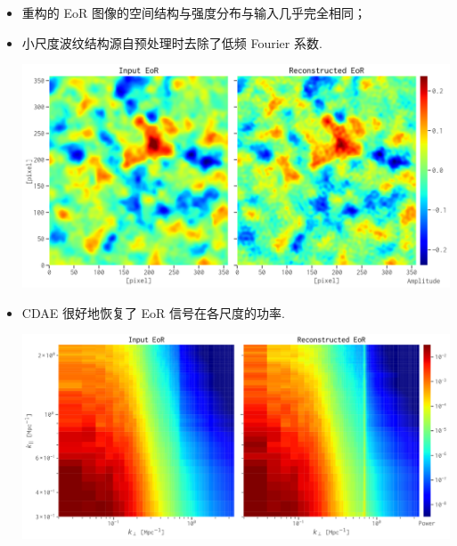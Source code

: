 \documentclass{beamer}
\begin{document}
\begin{frame}
  \vspace{1ex}
  \begin{itemize}
    \item 重构的 EoR 图像的空间结构与强度分布与输入几乎完全相同；
    \item 小尺度波纹结构源自预处理时去除了低频 Fourier 系数.
      \par\includegraphics[height=0.44\textheight]{cdae-eor-img-comp}
    \item CDAE 很好地恢复了 EoR 信号在各尺度的功率.
      \par\includegraphics[height=0.44\textheight]{cdae-eor-ps-comp}
  \end{itemize}
\end{frame}
\end{document}
